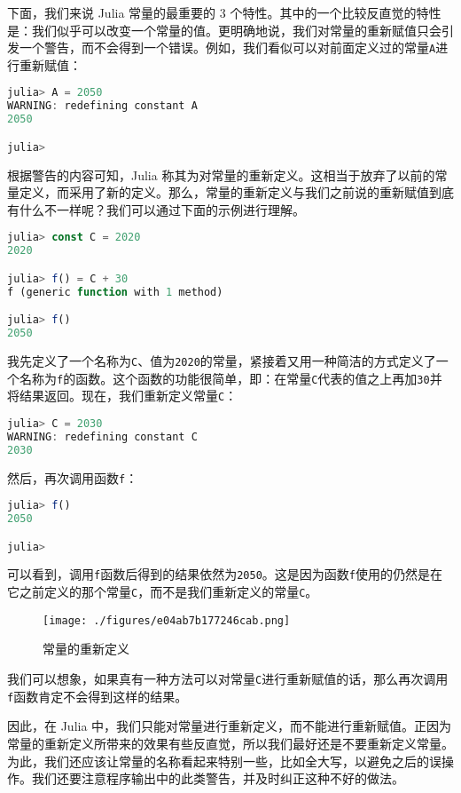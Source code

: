 下面，我们来说 Julia 常量的最重要的 3 个特性。其中的一个比较反直觉的特性是：我们似乎可以改变一个常量的值。更明确地说，我们对常量的重新赋值只会引发一个警告，而不会得到一个错误。例如，我们看似可以对前面定义过的常量\verb|A|进行重新赋值：

\begin{lstlisting}[language=julia]
julia> A = 2050
WARNING: redefining constant A
2050

julia> 
\end{lstlisting}

根据警告的内容可知，Julia 称其为对常量的重新定义。这相当于放弃了以前的常量定义，而采用了新的定义。那么，常量的重新定义与我们之前说的重新赋值到底有什么不一样呢？我们可以通过下面的示例进行理解。

\begin{lstlisting}[language=julia]
julia> const C = 2020 
2020

julia> f() = C + 30
f (generic function with 1 method)

julia> f()
2050
\end{lstlisting}

我先定义了一个名称为\verb|C|、值为\verb|2020|的常量，紧接着又用一种简洁的方式定义了一个名称为\verb|f|的函数。这个函数的功能很简单，即：在常量\verb|C|代表的值之上再加\verb|30|并将结果返回。现在，我们重新定义常量\verb|C|：

\begin{lstlisting}[language=julia]
julia> C = 2030
WARNING: redefining constant C
2030
\end{lstlisting}

然后，再次调用函数\verb|f|：

\begin{lstlisting}[language=julia]
julia> f()
2050

julia> 
\end{lstlisting}

可以看到，调用\verb|f|函数后得到的结果依然为\verb|2050|。这是因为函数\verb|f|使用的仍然是在它之前定义的那个常量\verb|C|，而不是我们重新定义的常量\verb|C|。

\begin{figure}[ht]
\centering
\texttt{[image: ./figures/e04ab7b177246cab.png]}
\caption{常量的重新定义} \label{fig_JuC3S4_1}
\end{figure}

我们可以想象，如果真有一种方法可以对常量\verb|C|进行重新赋值的话，那么再次调用\verb|f|函数肯定不会得到这样的结果。

因此，在 Julia 中，我们只能对常量进行重新定义，而不能进行重新赋值。正因为常量的重新定义所带来的效果有些反直觉，所以我们最好还是不要重新定义常量。为此，我们还应该让常量的名称看起来特别一些，比如全大写，以避免之后的误操作。我们还要注意程序输出中的此类警告，并及时纠正这种不好的做法。

